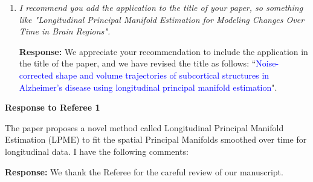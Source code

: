 \documentclass[12pt]{article}
\theoremstyle{definition}
\newcommand{\revision}[1]{\textcolor{blue}{#1}}
\begin{document}
\begin{enumerate}
We now add the following in Section 6 to encourage further investigation. 

\revision{It may be useful to explore alterations to the criterion function given in Equation 4 that enforce a different set of assumptions if, for example, stronger prior beliefs exist regarding the nature of changes in the target manifold.}


\item {\it I recommend you add the application to the title of your paper, so something like "Longitudinal Principal Manifold Estimation for Modeling Changes Over Time in Brain Regions".}

{\bf Response:} We appreciate your recommendation to include the application in the title of the paper, and we have revised the title as follows: ``\revision{Noise-corrected shape and volume trajectories of subcortical structures in Alzheimer's disease using longitudinal principal manifold estimation}".


\end{enumerate}


\large{\textbf{Response to Referee 1}}

\vspace{0.25in}

The paper proposes a novel method called Longitudinal Principal Manifold Estimation (LPME) to fit the spatial Principal Manifolds smoothed over time for longitudinal data. I have the following comments:

\smallskip

{\bf Response:} We thank the Referee for the careful review of our manuscript. 
\end{document}
